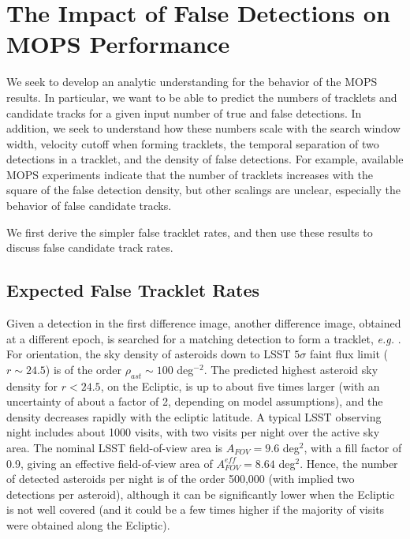 \section{The Impact of False Detections on MOPS Performance \label{sec:appMOPS}}


We seek to develop an analytic understanding for the behavior of the MOPS results.
In particular, we want to be able to predict the numbers of tracklets and
candidate tracks for a given input number of true and false detections. In addition, we seek
to understand how these numbers scale with the search window width,
velocity cutoff when forming tracklets, the temporal separation of two
detections in a tracklet, and the density of false detections. For example, available
MOPS experiments indicate that the number of tracklets increases with
the square of the false detection density, but other scalings are unclear,
especially the behavior of false candidate tracks.

We first derive the simpler false tracklet rates, and then use these results to
discuss false candidate track rates. 


\subsection{Expected False Tracklet Rates \label{sec:tracklets} }

Given a detection in the first difference image, another difference image, obtained at a different epoch,
is searched for a matching detection to form a tracklet,  {\it e.g.} \citet{denneau13, kubica07}. For orientation,
the sky density of asteroids down to LSST $5\sigma$ faint flux limit ($r \sim 24.5$) is of the order
$\rho_{ast} \sim 100$ deg$^{-2}$. The predicted highest asteroid sky density for $r<24.5$,
on the Ecliptic, is up to about five times larger (with an uncertainty of about a factor of 2,
depending on model assumptions), and the density decreases rapidly with the ecliptic latitude.
A typical LSST observing night includes about 1000 visits, with two visits per night over
the active sky area. The nominal LSST field-of-view area is $A_{FOV}=9.6$ deg$^2$, with a
fill factor of 0.9, giving an effective field-of-view area of $A_{FOV}^{eff}=8.64$ deg$^2$. Hence,
the number of detected asteroids per night is of the order 500,000 (with implied two detections
per asteroid), although it can be significantly lower when the Ecliptic is not well covered (and
it could be a few times higher if the majority of visits were obtained along the Ecliptic).

